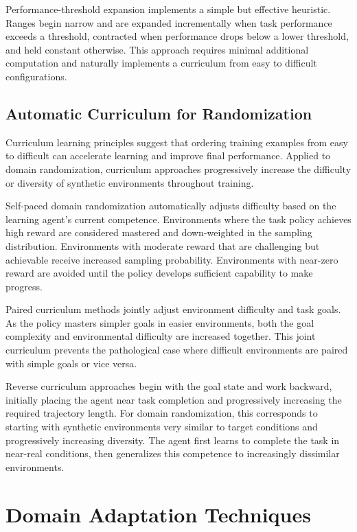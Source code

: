 Performance-threshold expansion implements a simple but effective heuristic. Ranges begin narrow and are expanded incrementally when task performance exceeds a threshold, contracted when performance drops below a lower threshold, and held constant otherwise. This approach requires minimal additional computation and naturally implements a curriculum from easy to difficult configurations.

\subsection{Automatic Curriculum for Randomization}

Curriculum learning principles suggest that ordering training examples from easy to difficult can accelerate learning and improve final performance. Applied to domain randomization, curriculum approaches progressively increase the difficulty or diversity of synthetic environments throughout training.

Self-paced domain randomization automatically adjusts difficulty based on the learning agent's current competence. Environments where the task policy achieves high reward are considered mastered and down-weighted in the sampling distribution. Environments with moderate reward that are challenging but achievable receive increased sampling probability. Environments with near-zero reward are avoided until the policy develops sufficient capability to make progress.

Paired curriculum methods jointly adjust environment difficulty and task goals. As the policy masters simpler goals in easier environments, both the goal complexity and environmental difficulty are increased together. This joint curriculum prevents the pathological case where difficult environments are paired with simple goals or vice versa.

Reverse curriculum approaches begin with the goal state and work backward, initially placing the agent near task completion and progressively increasing the required trajectory length. For domain randomization, this corresponds to starting with synthetic environments very similar to target conditions and progressively increasing diversity. The agent first learns to complete the task in near-real conditions, then generalizes this competence to increasingly dissimilar environments.

\section{Domain Adaptation Techniques}
\label{sec:domain_adaptation}

